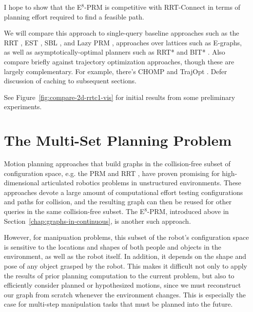 
I hope to show that the E$^8$-PRM is competitive with RRT-Connect
in terms of planning effort required to find a feasible path.

We will compare this approach to
single-query baseline approaches
such as the RRT \citep{kuffner2000rrtconnect},
EST \citep{hsu1997expansive},
SBL \citep{sanchezante2001sbl},
and Lazy PRM \citep{bohlin2000lazyprm},
approaches over lattices such as E-graphs,
as well as asymptotically-optimal planners such as
RRT* \citep{karaman2011samplingoptimal}
and BIT* \citep{gammell2015bitstar}.
Also compare briefly against trajectory optimization approaches,
though these are largely complementary.
For example, there's CHOMP \citep{zucker2013chomp}
and TrajOpt \citep{schulman2013trajopt}.
Defer discussion of caching to subsequent
sections.

See Figure~\ref{fig:compare-2d-rrtc1-vis}
for initial results from some preliminary experiments.

\clearpage
\section{The Multi-Set Planning Problem}
\label{chap:multi-set}

Motion planning approaches that build graphs
in the collision-free subset of
configuration space,
e.g. the
PRM \citep{kavrakietal1996prm}
and RRT \citep{lavallekuffner1999rrt},
have proven promising
for high-dimensional articulated robotics problems
in unstructured environments.
These approaches devote a large amount of computational effort
testing configurations and paths for collision,
and the resulting graph can then be reused
for other queries in the same collision-free subset.
The E$^8$-PRM,
introduced above in Section~\ref{chap:graphs-in-continuous},
is another such approach.

However,
for manipuation problems,
this subset of the robot's configuration space
is sensitive to the locations and shapes of
both people and objects in the environment,
as well as the robot itself.
In addition, it depends on the shape and pose of any object
grasped by the robot.
This makes it difficult not only to apply the results of prior
planning computation to the current problem,
but also to efficiently consider planned or hypothesized motions,
since we must reconstruct our graph from scratch whenever
the environment changes.
This is especially the case for
multi-step manipulation tasks that must be planned into the future.

